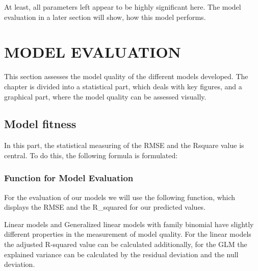 \documentclass[
]{article}
\begin{document}
At least, all parameters left appear to be highly significant here. The
model evaluation in a later section will show, how this model performs.
\newpage

\hypertarget{model-evaluation}{%
\section{MODEL EVALUATION}\label{model-evaluation}}

This section assesses the model quality of the different models
developed. The chapter is divided into a statistical part, which deals
with key figures, and a graphical part, where the model quality can be
assessed visually.

\hypertarget{model-fitness}{%
\subsection{Model fitness}\label{model-fitness}}

In this part, the statistical measuring of the RMSE and the Rsquare
value is central. To do this, the following formula is formulated:

\hypertarget{function-for-model-evaluation}{%
\subsubsection{Function for Model
Evaluation}\label{function-for-model-evaluation}}

For the evaluation of our models we will use the following function,
which displays the RMSE and the R\_squared for our predicted values.

Linear models and Generalized linear models with family binomial have
slightly different properties in the measurement of model quality. For
the linear models the adjusted R-squared value can be calculated
additionally, for the GLM the explained variance can be calculated by
the residual deviation and the null deviation.
\end{document}
